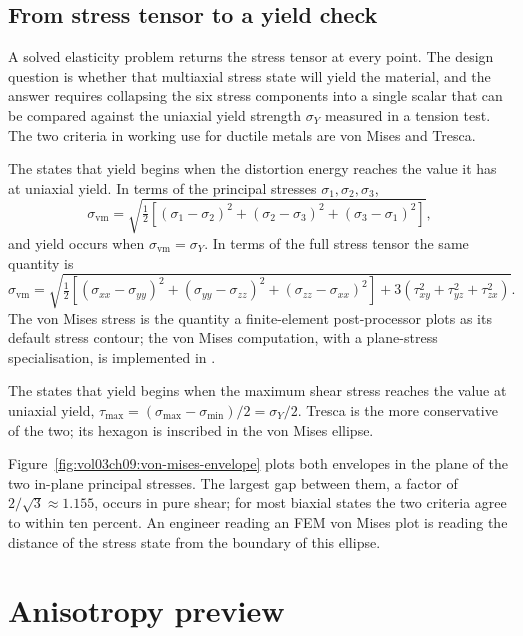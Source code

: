 \subsection{From stress tensor to a yield check}

A solved elasticity problem returns the stress tensor at every point.
The design question is whether that multiaxial stress state will yield
the material, and the answer requires collapsing the six stress
components into a single scalar that can be compared against the
uniaxial yield strength $\sigma_Y$ measured in a tension test. The
two criteria in working use for ductile metals are von Mises and
Tresca.

The  states that yield begins when the
distortion energy reaches the value it has at uniaxial yield. In terms
of the principal stresses $\sigma_1, \sigma_2, \sigma_3$,
\[
\sigma_{\text{vm}} = \sqrt{\tfrac{1}{2}\left[(\sigma_1-\sigma_2)^2 +
(\sigma_2-\sigma_3)^2 + (\sigma_3-\sigma_1)^2\right]},
\]
and yield occurs when $\sigma_{\text{vm}} = \sigma_Y$. In terms of the
full stress tensor the same quantity is
\[
\sigma_{\text{vm}} = \sqrt{\tfrac{1}{2}\left[(\sigma_{xx}-\sigma_{yy})^2
+ (\sigma_{yy}-\sigma_{zz})^2 + (\sigma_{zz}-\sigma_{xx})^2\right]
+ 3\left(\tau_{xy}^2 + \tau_{yz}^2 + \tau_{zx}^2\right)}.
\]
The von Mises stress is the quantity a finite-element post-processor
plots as its default stress contour; the von Mises computation, with a
plane-stress specialisation, is implemented in
.

The  states that yield begins when the
maximum shear stress reaches the value at uniaxial yield, $\tau_{\max}
= (\sigma_{\max} - \sigma_{\min})/2 = \sigma_Y/2$. Tresca is the more
conservative of the two; its hexagon is inscribed in the von Mises
ellipse.



Figure~\ref{fig:vol03ch09:von-mises-envelope} plots both envelopes in
the plane of the two in-plane principal stresses. The largest gap
between them, a factor of $2/\sqrt{3} \approx 1.155$, occurs in pure
shear; for most biaxial states the two criteria agree to within ten
percent. An engineer reading an FEM von Mises plot is reading the
distance of the stress state from the boundary of this ellipse.

\section{Anisotropy preview}


